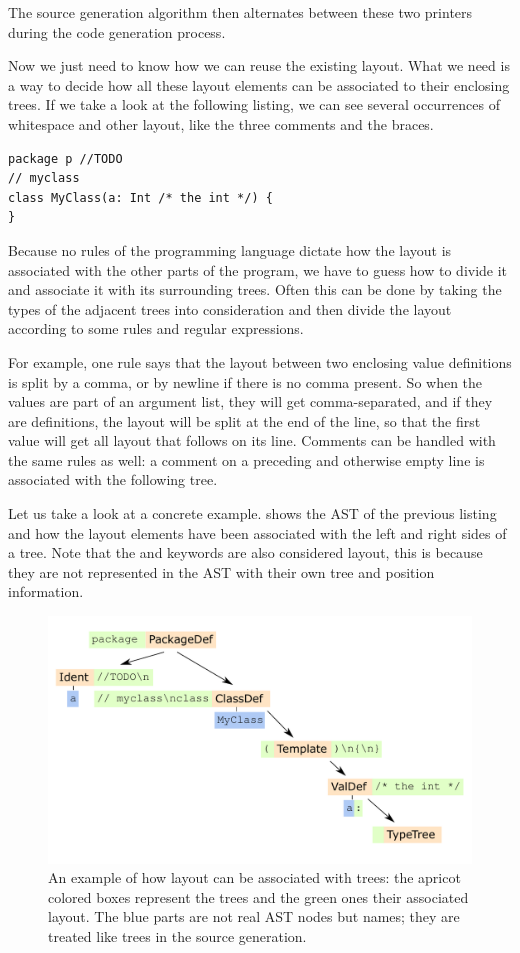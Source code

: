 The source generation algorithm then alternates between these two printers during the code generation process.

Now we just need to know how we can reuse the existing layout. What we need is a way to decide how all these layout elements can be associated to their enclosing trees. If we take a look at the following listing, we can see several occurrences of whitespace and other layout, like the three comments and the braces.

\begin{lstlisting}
package p //TODO
// myclass
class MyClass(a: Int /* the int */) {
}
\end{lstlisting}

Because no rules of the programming language dictate how the layout is associated with the other parts of the program, we have to guess how to divide it and associate it with its surrounding trees. Often this can be done by taking the types of the adjacent trees into consideration and then divide the layout according to some rules and regular expressions. 

For example, one rule says that the layout between two enclosing value definitions is split by a comma, or by newline if there is no comma present. So when the values are part of an argument list, they will get comma-separated, and if they are definitions, the layout will be split at the end of the line, so that the first value will get all layout that follows on its line. Comments can be handled with the same rules as well: a comment on a preceding and otherwise empty line is associated with the following tree.

Let us take a look at a concrete example.  shows the AST of the previous listing and how the layout elements have been associated with the left and right sides of a tree. Note that the  and  keywords are also considered layout, this is because they are not represented in the AST with their own tree and position information.

\begin{figure}
 \centering
 \includegraphics[width=0.8\linewidth]{ast_with_layout.pdf}
 \caption{An example of how layout can be associated with trees: the apricot colored boxes represent the trees and the green ones their associated layout. The blue parts are not real AST nodes but names; they are treated like trees in the source generation.}
 \label{figure:ast_with_layout}
\end{figure}

